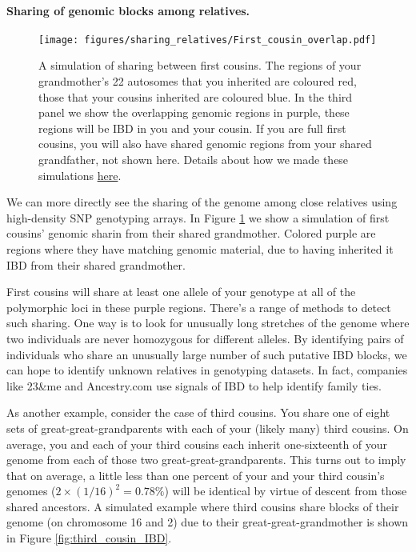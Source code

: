 {{\paragraph{Sharing of genomic blocks among relatives.}
\begin{figure}
\begin{center}
\texttt{[image: figures/sharing\_relatives/First\_cousin\_overlap.pdf]}
\end{center}
\caption[]{A simulation of sharing between first cousins. The regions of your grandmother's 22 autosomes that you inherited are
coloured red, those that your cousins inherited are coloured blue. In the third panel we show the overlapping genomic regions in purple, these regions will be IBD in you and your cousin. If you are full first cousins, you will also have shared genomic regions from your shared grandfather, not shown here. Details about how we made these simulations \href{https://gcbias.org/2013/12/02/how-many-genomic-blocks-do-you-share-with-a-cousin/}{here}.
} \label{fig:first_cousin_IBD}
\end{figure}
We can more directly see the sharing of the genome among close
relatives using high-density SNP genotyping arrays. In Figure
\ref{fig:first_cousin_IBD} we show a simulation of first cousins'
genomic sharin from their shared grandmother. Colored purple are
regions where they have matching genomic material, due to having
inherited it IBD from their shared grandmother.


First cousins will share at least one allele of your genotype at all of the polymorphic loci in these purple regions. There's a range of methods to detect such sharing. One way is to look for unusually long stretches of the genome where two individuals are never homozygous for different alleles. By identifying pairs of individuals who share an unusually large number of such putative IBD blocks, we can hope to identify unknown relatives in genotyping datasets. In fact, companies like 23\&me and Ancestry.com use signals of IBD to help identify family ties.

As another example, consider the case of third cousins. You share one of eight sets of great-great-grandparents with each of your (likely many) third cousins. On average, you and each of your third cousins each inherit one-sixteenth of your genome from each of those two great-great-grandparents. This turns out to imply that on average, a little less than one percent of your and your third cousin's genomes ($2 \times (1/16)^2 =0.78\%$) will be identical by virtue of descent from those shared ancestors. A simulated example where third cousins share blocks of their genome (on chromosome 16 and 2) due to their great-great-grandmother is shown in Figure \ref{fig:third_cousin_IBD}.

}}

